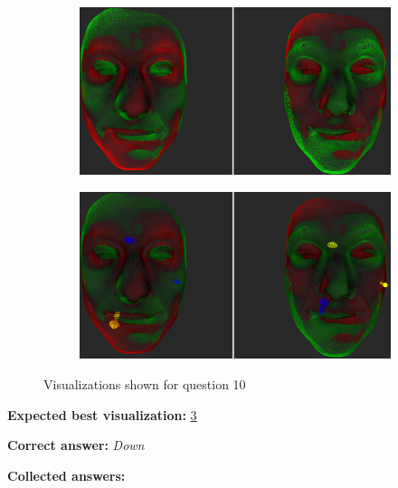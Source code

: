 \begin{figure}[h]
\begin{subfigure}{0.49\textwidth}
\includegraphics[width=\textwidth]{./screenshots/pair20.PNG}
\caption{}
\label{fig:study-9-20}
\end{subfigure}
\begin{subfigure}{0.49\textwidth}
\includegraphics[width=\textwidth]{./screenshots/pair24.PNG}
\caption{}
\label{fig:study-9-24}
\end{subfigure}
\caption{Visualizations shown for question 10}
\end{figure}
\medskip

{\bf Expected best visualization:} \ref{fig:study-9-24}
\medskip

{\bf Correct answer:} {\it Down}
\medskip

{\bf Collected answers:}

